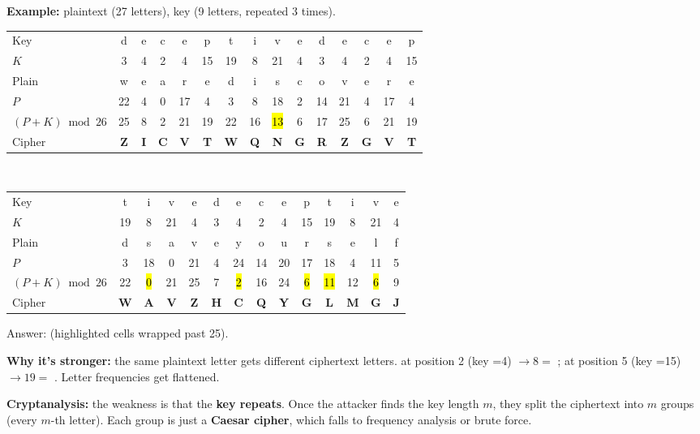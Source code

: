 \textbf{Example:} plaintext  (27 letters), key  (9 letters, repeated 3 times).
\begin{center}\footnotesize\setlength{\tabcolsep}{2.9pt}
\begin{tabular}{@{}l*{14}{c}@{}}
\toprule
Key & d&e&c&e&p&t&i&v&e&d&e&c&e&p\\
$K$ & 3&4&2&4&15&19&8&21&4&3&4&2&4&15\\
Plain & w&e&a&r&e&d&i&s&c&o&v&e&r&e\\
$P$ & 22&4&0&17&4&3&8&18&2&14&21&4&17&4\\
$(P{+}K) \bmod 26$ & 25&8&2&21&19&22&16&\hl{13}&6&17&25&6&21&19\\
Cipher & \textbf{Z}&\textbf{I}&\textbf{C}&\textbf{V}&\textbf{T}&\textbf{W}&\textbf{Q}&\textbf{N}&\textbf{G}&\textbf{R}&\textbf{Z}&\textbf{G}&\textbf{V}&\textbf{T}\\
\bottomrule
\end{tabular}
\\[4pt]
\begin{tabular}{@{}l*{13}{c}@{}}
\toprule
Key & t&i&v&e&d&e&c&e&p&t&i&v&e\\
$K$ & 19&8&21&4&3&4&2&4&15&19&8&21&4\\
Plain & d&s&a&v&e&y&o&u&r&s&e&l&f\\
$P$ & 3&18&0&21&4&24&14&20&17&18&4&11&5\\
$(P{+}K) \bmod 26$ & 22&\hl{0}&21&25&7&\hl{2}&16&24&\hl{6}&\hl{11}&12&\hl{6}&9\\
Cipher & \textbf{W}&\textbf{A}&\textbf{V}&\textbf{Z}&\textbf{H}&\textbf{C}&\textbf{Q}&\textbf{Y}&\textbf{G}&\textbf{L}&\textbf{M}&\textbf{G}&\textbf{J}\\
\bottomrule
\end{tabular}
\end{center}
Answer: \textbf{} (highlighted cells wrapped past 25).

\textbf{Why it's stronger:} the same plaintext letter gets different ciphertext letters.  at position 2 (key =4) $\to 8 =$ ;  at position 5 (key =15) $\to 19 =$ . Letter frequencies get flattened.

\textbf{Cryptanalysis:} the weakness is that the \textbf{key repeats}. Once the attacker finds the key length $m$, they split the ciphertext into $m$ groups (every $m$-th letter). Each group is just a \textbf{Caesar cipher}, which falls to frequency analysis or brute force.

